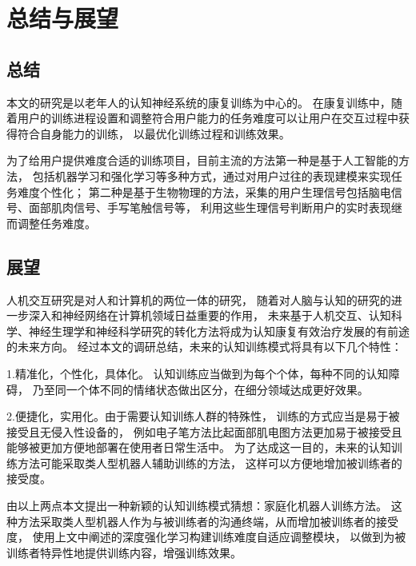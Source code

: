 \documentclass[12pt]{article}
\begin{document}
    \section{总结与展望}
    \subsection{总结}
    本文的研究是以老年人的认知神经系统的康复训练为中心的。
    在康复训练中，随着用户的训练进程设置和调整符合用户能力的任务难度可以让用户在交互过程中获得符合自身能力的训练，
    以最优化训练过程和训练效果。
    
    为了给用户提供难度合适的训练项目，目前主流的方法第一种是基于人工智能的方法，
    包括机器学习和强化学习等多种方式，通过对用户过往的表现建模来实现任务难度个性化；
    第二种是基于生物物理的方法，采集的用户生理信号包括脑电信号、面部肌肉信号、手写笔触信号等，
    利用这些生理信号判断用户的实时表现继而调整任务难度。


    \subsection{展望}
    人机交互研究是对人和计算机的两位一体的研究，
    随着对人脑与认知的研究的进一步深入和神经网络在计算机领域日益重要的作用，
    未来基于人机交互、认知科学、神经生理学和神经科学研究的转化方法将成为认知康复有效治疗发展的有前途的未来方向。
    经过本文的调研总结，未来的认知训练模式将具有以下几个特性：

    1.精准化，个性化，具体化。
    认知训练应当做到为每个个体，每种不同的认知障碍，
    乃至同一个体不同的情绪状态做出区分，在细分领域达成更好效果。

    2.便捷化，实用化。由于需要认知训练人群的特殊性，
    训练的方式应当是易于被接受且无侵入性设备的，
    例如电子笔方法比起面部肌电图方法更加易于被接受且能够被更加方便地部署在使用者日常生活中。
    为了达成这一目的，未来的认知训练方法可能采取类人型机器人辅助训练的方法，
    这样可以方便地增加被训练者的接受度。

    由以上两点本文提出一种新颖的认知训练模式猜想：家庭化机器人训练方法。
    这种方法采取类人型机器人作为与被训练者的沟通终端，从而增加被训练者的接受度，
    使用上文中阐述的深度强化学习构建训练难度自适应调整模块，
    以做到为被训练者特异性地提供训练内容，增强训练效果。
\end{document}

